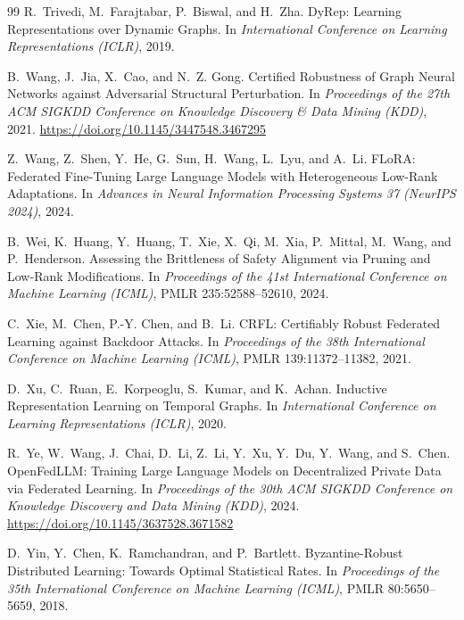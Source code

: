 \documentclass[11pt]{article}
\theoremstyle{plain}
\theoremstyle{definition}
\theoremstyle{remark}
\begin{document}
\begin{thebibliography}{99}
R.~Trivedi, M.~Farajtabar, P.~Biswal, and H.~Zha.
\newblock DyRep: Learning Representations over Dynamic Graphs.
\newblock In \emph{International Conference on Learning Representations (ICLR)}, 2019.

B.~Wang, J.~Jia, X.~Cao, and N.~Z. Gong.
\newblock Certified Robustness of Graph Neural Networks against Adversarial Structural Perturbation.
\newblock In \emph{Proceedings of the 27th ACM SIGKDD Conference on Knowledge Discovery \& Data Mining (KDD)}, 2021.
\newblock \url{https://doi.org/10.1145/3447548.3467295}

Z.~Wang, Z.~Shen, Y.~He, G.~Sun, H.~Wang, L.~Lyu, and A.~Li.
\newblock FLoRA: Federated Fine-Tuning Large Language Models with Heterogeneous Low-Rank Adaptations.
\newblock In \emph{Advances in Neural Information Processing Systems 37 (NeurIPS 2024)}, 2024.

B.~Wei, K.~Huang, Y.~Huang, T.~Xie, X.~Qi, M.~Xia, P.~Mittal, M.~Wang, and P.~Henderson.
\newblock Assessing the Brittleness of Safety Alignment via Pruning and Low-Rank Modifications.
\newblock In \emph{Proceedings of the 41st International Conference on Machine Learning (ICML)}, PMLR 235:52588--52610, 2024.

C.~Xie, M.~Chen, P.-Y. Chen, and B.~Li.
\newblock CRFL: Certifiably Robust Federated Learning against Backdoor Attacks.
\newblock In \emph{Proceedings of the 38th International Conference on Machine Learning (ICML)}, PMLR 139:11372--11382, 2021.

D.~Xu, C.~Ruan, E.~Korpeoglu, S.~Kumar, and K.~Achan.
\newblock Inductive Representation Learning on Temporal Graphs.
\newblock In \emph{International Conference on Learning Representations (ICLR)}, 2020.

R.~Ye, W.~Wang, J.~Chai, D.~Li, Z.~Li, Y.~Xu, Y.~Du, Y.~Wang, and S.~Chen.
\newblock OpenFedLLM: Training Large Language Models on Decentralized Private Data via Federated Learning.
\newblock In \emph{Proceedings of the 30th ACM SIGKDD Conference on Knowledge Discovery and Data Mining (KDD)}, 2024.
\newblock \url{https://doi.org/10.1145/3637528.3671582}

D.~Yin, Y.~Chen, K.~Ramchandran, and P.~Bartlett.
\newblock Byzantine-Robust Distributed Learning: Towards Optimal Statistical Rates.
\newblock In \emph{Proceedings of the 35th International Conference on Machine Learning (ICML)}, PMLR 80:5650--5659, 2018.


\end{thebibliography}
\end{document}
